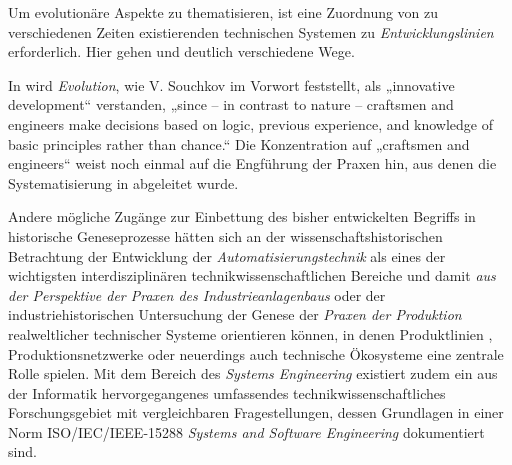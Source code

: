 \documentclass[11pt,a4paper]{article}
\begin{document}
Um evolutionäre Aspekte zu thematisieren, ist eine Zuordnung von zu
verschiedenen Zeiten existierenden technischen Systemen zu
\emph{Entwicklungslinien} erforderlich. Hier gehen \cite{Shpakovsky2010} und
\cite{TESE2018} deutlich verschiedene Wege.

In \cite{TESE2018} wird \emph{Evolution}, wie V. Souchkov im Vorwort
\cite[S. IX]{TESE2018} feststellt, als „innovative development“ verstanden,
„since -- in contrast to nature -- craftsmen and engineers make decisions
based on logic, previous experience, and knowledge of basic principles rather
than chance.“ Die Konzentration auf „craftsmen and engineers“ weist noch
einmal auf die Engführung der Praxen hin, aus denen die Systematisierung in
\cite{TESE2018} abgeleitet wurde.

Andere mögliche Zugänge zur Einbettung des bisher entwickelten Begriffs in
historische Geneseprozesse hätten sich an der wissenschaftshistorischen
Betrachtung \cite{Weller2008} der Entwicklung der
\emph{Automatisierungstechnik} als eines der wichtigsten interdisziplinären
technikwissenschaftlichen Bereiche und damit \emph{aus der Perspektive der
  Praxen des Industrieanlagenbaus} oder der industriehistorischen Untersuchung
der Genese der \emph{Praxen der Produktion} realweltlicher technischer Systeme
orientieren können, in denen Produktlinien \cite{Pohl2005},
Produktionsnetzwerke \cite{Friedli2013} oder neuerdings auch technische
Ökosysteme \cite{Graebe2018} eine zentrale Rolle spielen. Mit dem Bereich des
\emph{Systems Engineering} existiert zudem ein aus der Informatik
hervorgegangenes umfassendes technikwissenschaftliches Forschungsgebiet mit
vergleichbaren Fragestellungen, dessen Grundlagen in einer Norm
ISO/IEC/IEEE-15288 \emph{Systems and Software Engineering} dokumentiert sind.
\end{document}
